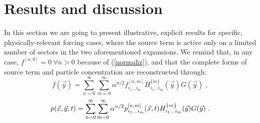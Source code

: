 \section{Results and discussion} \label{sect}
%
In this section we are going to present illustrative, explicit results for specific, physically-relevant forcing cases,
where the source term is active only on a limited number of sectors in the two aforementioned expansions.
We remind that, in any case, $f^{[n,0]}=0\ \forall n>0$ because of (\ref{normaliz}),
and that the complete forms of source term and particle concentration
are reconstructed through:
\begin{equation} \label{somm}
 f(\vec{y})=\sum_{n=0}^{\infty}\sum_{m=0}^{\infty}\alpha^{n/2}f^{[n,m]}_{i_1\ldots i_m}H^{\{m\}}_{i_1\ldots i_m}(\vec{y})G(\vec{y})\;,
\end{equation}
\begin{equation} \label{sum}
 p(\vec{x},\vec{y},t)=\sum_{n=0}^{\infty}\sum_{m=0}^{\infty}\alpha^{n/2}p^{[n,m]}_{i_1\ldots i_m}(\vec{x},t)H^{\{m\}}_{i_1\ldots i_m}(\vec{y})G(\vec{y})\;.
\end{equation}
%
